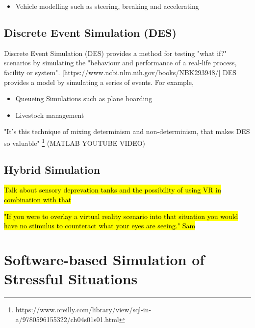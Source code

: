 \documentclass{article}
\begin{document}

\begin{itemize}
  \item Vehicle modelling such as steering, breaking and accelerating
\end{itemize}

\subsection{Discrete Event Simulation (DES)}



Discrete Event Simulation (DES) provides a method for testing "what if?" scenarios by simulating the "behaviour and performance of a real-life process, facility or system". [https://www.ncbi.nlm.nih.gov/books/NBK293948/] DES provides a model by simulating a series of events. For example, 

\begin{itemize}
  \item Queueing Simulations such as plane boarding
  \item Livestock management
\end{itemize}

"It's this technique of mixing determinism and non-determinism, that makes DES so valuable" \footnote{https://www.oreilly.com/library/view/sql-in-a/9780596155322/ch04s01s01.html} (MATLAB YOUTUBE VIDEO)


\subsection{Hybrid Simulation}


\hl{Talk about sensory deprevation tanks and the possibility of using VR in combination with that}

\hl{"If you were to overlay a virtual reality scenario into that situation you would have no stimulus to counteract what your eyes are seeing." Sam}


\section{Software-based Simulation of Stressful Situations}
\end{document}
